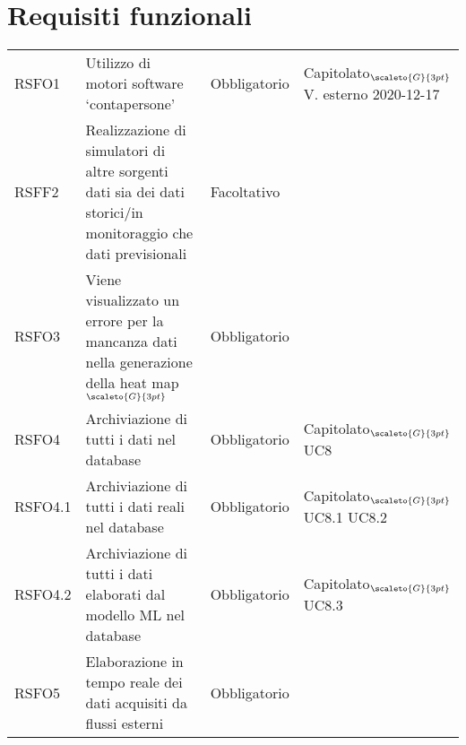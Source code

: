 \clearpage
\section{Requisiti funzionali}\label{RequisitiFunzionali}

\def\tabularxcolumn#1{m{#1}}
{

	\begin{center}
		\renewcommand{\arraystretch}{1.4}
		\begin{longtable}{|p{2.5cm}|p{4.5cm}|p{3.5cm}|p{4cm}|}
			\hline
			\rowcolor{airforceblue}
			\makecell[c]{\textbf{Codice RS}} & \makecell[c]{\textbf{Descrizione}} & \makecell[c]{\textbf{Tipo di requisito}} & \makecell[c]{\textbf{Fonte}} \\
			\hline
			\centering RSFO1 & Utilizzo di motori software ‘contapersone’  &\centering  Obbligatorio & \makecell[tc]{Capitolato$_{\scaleto{G}{3pt}}$ \\ V. esterno 2020-12-17 } \\
			\hline
			\centering RSFF2 & Realizzazione di simulatori di altre sorgenti dati sia dei dati storici/in monitoraggio che dati previsionali & \centering Facoltativo & \makecell[tc]{Capitolato$_{\scaleto{G}{3pt}}$ } \\
			\hline
			\centering RSFO3  & Viene visualizzato un  errore per la mancanza dati nella generazione della heat map$_{\scaleto{G}{3pt}}$  &\centering  Obbligatorio & \makecell[tc]{UC2}  \\
			\hline
			\centering RSFO4 & Archiviazione di tutti i dati nel database & \centering Obbligatorio & \makecell[tc]{Capitolato$_{\scaleto{G}{3pt}}$ \\ UC8}  \\
			\hline
			\centering RSFO4.1 & Archiviazione di tutti i dati reali nel database & \centering Obbligatorio & \makecell[tc]{Capitolato$_{\scaleto{G}{3pt}}$ \\ UC8.1 \\ UC8.2}  \\
			\hline
			\centering RSFO4.2 & Archiviazione di tutti i dati elaborati dal modello ML nel database & \centering Obbligatorio & \makecell[tc]{Capitolato$_{\scaleto{G}{3pt}}$ \\ UC8.3}  \\
			\hline
			\centering RSFO5 & Elaborazione in tempo reale dei dati acquisiti da flussi esterni &\centering  Obbligatorio & \makecell[tc]{Capitolato$_{\scaleto{G}{3pt}}$}  \\

\end{longtable}
\end{center}}
